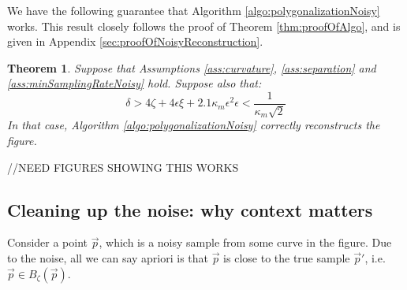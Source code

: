 \documentclass{article}
\newtheorem{theorem}[cntr]{Theorem}
\numberwithin{cntr}{section}
\numberwithin{equation}{section}
\newcommand{\vp}[0]{{\vec{p}}}
\newcommand{\ball}[2]{ { B_{#1}(#2) } }
\newcommand{\curvemax}{{\kappa_{m}}}
\newcommand{\curvesep}{{\delta}}
\newcommand{\pointNoise}{{\zeta}}
\newcommand{\tanNoise}{{\xi}}
\begin{document}
We have the following guarantee that Algorithm \ref{algo:polygonalizationNoisy} works. This result closely follows the proof of Theorem \ref{thm:proofOfAlgo}, and is given in Appendix \ref{sec:proofOfNoisyReconstruction}.

\begin{theorem}
  \label{thm:noisyReconstruction}
  Suppose that Assumptions \ref{ass:curvature}, \ref{ass:separation} and \ref{ass:minSamplingRateNoisy} hold. Suppose also that:
  \begin{subequations}
    \label{eq:noisySeparationConditions}
    \begin{equation}
      \label{eq:noisySeparationDistance}
      \curvesep > 4 \pointNoise + 4 \epsilon \tanNoise + 2.1 \curvemax \epsilon^{2}
    \end{equation}
    \begin{equation}
      \label{eq:noisyConstraintOnkmaxEpsilon}
      \epsilon < \frac{1}{ \curvemax \sqrt{2}}
    \end{equation}
  \end{subequations}
  In that case, Algorithm \ref{algo:polygonalizationNoisy} correctly reconstructs the figure.
\end{theorem}

//NEED FIGURES SHOWING THIS WORKS

\subsection{Cleaning up the noise: why context matters}

Consider a point $\vp$, which is a noisy sample from some curve in the figure. Due to the noise, all we can say apriori is that $\vp$ is close to the true sample $\vp'$, i.e. $\vp \in \ball{\pointNoise}{\vp}$.
\end{document}
